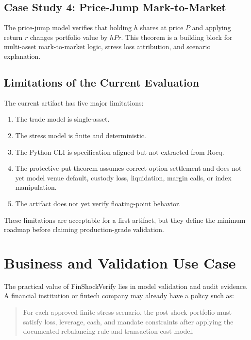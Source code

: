 \documentclass[11pt]{article}
\begin{document}
\subsection{Case Study 4: Price-Jump Mark-to-Market}

The price-jump model verifies that holding \(h\) shares at price \(P\) and
applying return \(r\) changes portfolio value by \(hPr\). This theorem is a
building block for multi-asset mark-to-market logic, stress loss attribution,
and scenario explanation.

\subsection{Limitations of the Current Evaluation}

The current artifact has five major limitations:

\begin{enumerate}
  \item The trade model is single-asset.
  \item The stress model is finite and deterministic.
  \item The Python CLI is specification-aligned but not extracted from Rocq.
  \item The protective-put theorem assumes correct option settlement and does
  not yet model venue default, custody loss, liquidation, margin calls, or
  index manipulation.
  \item The artifact does not yet verify floating-point behavior.
\end{enumerate}

These limitations are acceptable for a first artifact, but they define the
minimum roadmap before claiming production-grade validation.

\section{Business and Validation Use Case}

The practical value of FinShockVerify lies in model validation and audit
evidence. A financial institution or fintech company may already have a policy
such as:

\begin{quote}
For each approved finite stress scenario, the post-shock portfolio must satisfy
loss, leverage, cash, and mandate constraints after applying the documented
rebalancing rule and transaction-cost model.
\end{quote}
\end{document}
